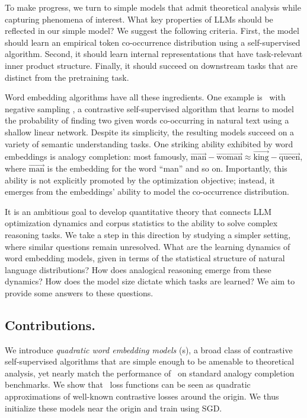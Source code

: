 To make progress, we turn to simple models that admit theoretical analysis while capturing phenomena of interest.
What key properties of LLMs should be reflected in our simple model?
We suggest the following criteria.
First, the model should learn an empirical token co-occurrence distribution using a self-supervised algorithm.
Second, it should learn internal representations that have task-relevant inner product structure.
Finally, it should succeed on downstream tasks that are distinct from the pretraining task.

Word embedding algorithms have all these ingredients.
One example is \wtv\ with negative sampling \citep{mikolov2013distributed}, a contrastive self-supervised algorithm that learns to model the probability of finding two given words co-occurring in natural text using a shallow linear network.
Despite its simplicity, the resulting models succeed on a variety of semantic understanding tasks.
One striking ability exhibited by word embeddings is analogy completion: most famously, $\vec{\mathrm{man}} - \vec{\mathrm{woman}} \approx \vec{\mathrm{king}} - \vec{\mathrm{queen}}$, where $\vec{\mathrm{man}}$ is the embedding for the word ``man'' and so on.
Importantly, this ability is not explicitly promoted by the optimization objective; instead, it emerges from the embeddings' ability to model the co-occurrence distribution.

It is an ambitious goal to develop quantitative theory that connects LLM optimization dynamics and corpus statistics to the ability to solve complex reasoning tasks.
We take a step in this direction by studying a simpler setting, where similar questions remain unresolved.
What are the learning dynamics of word embedding models, given in terms of the statistical structure of natural language distributions?
How does analogical reasoning emerge from these dynamics?
How does the model size dictate which tasks are learned?
We aim to provide some answers to these questions.

\subsection{Contributions.}

We introduce \textit{quadratic word embedding models} (\wem s), a broad class of contrastive self-supervised algorithms that are simple enough to be amenable to theoretical analysis, yet nearly match the performance of \wtv\ 
on standard analogy completion benchmarks.
We show that \wem\ loss functions can be seen as quadratic approximations of well-known contrastive losses around the origin.
We thus initialize these models near the origin and train using SGD.

